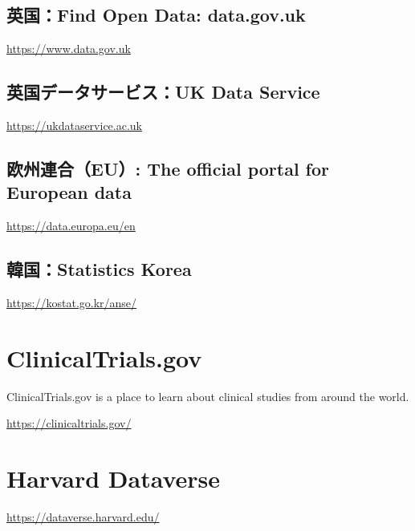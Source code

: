 \documentclass[
  xelatex, ja=standard]{bxjsbook}
\theoremstyle{definition}
\theoremstyle{definition}
\theoremstyle{definition}
\theoremstyle{definition}
\theoremstyle{remark}
\begin{document}
\hypertarget{ux82f1ux56fdfind-open-data-data.gov.uk}{%
\subsection{英国：Find Open Data: data.gov.uk}\label{ux82f1ux56fdfind-open-data-data.gov.uk}}

\url{https://www.data.gov.uk}

\hypertarget{ux82f1ux56fdux30c7ux30fcux30bfux30b5ux30fcux30d3ux30b9uk-data-service}{%
\subsection{英国データサービス：UK Data Service}\label{ux82f1ux56fdux30c7ux30fcux30bfux30b5ux30fcux30d3ux30b9uk-data-service}}

\url{https://ukdataservice.ac.uk}

\hypertarget{ux6b27ux5ddeux9023ux5408eu-the-official-portal-for-european-data}{%
\subsection{欧州連合（EU）: The official portal for European data}\label{ux6b27ux5ddeux9023ux5408eu-the-official-portal-for-european-data}}

\url{https://data.europa.eu/en}

\hypertarget{ux97d3ux56fdstatistics-korea}{%
\subsection{韓国：Statistics Korea}\label{ux97d3ux56fdstatistics-korea}}

\url{https://kostat.go.kr/anse/}

\hypertarget{clinicaltrials.gov}{%
\section{ClinicalTrials.gov}\label{clinicaltrials.gov}}

ClinicalTrials.gov is a place to learn about clinical studies from around the world.

\url{https://clinicaltrials.gov/}

\hypertarget{harvard-dataverse}{%
\section{Harvard Dataverse}\label{harvard-dataverse}}

\url{https://dataverse.harvard.edu/}
\end{document}

